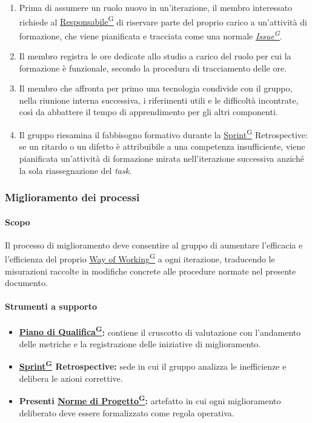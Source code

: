 \documentclass[a4paper,12pt]{article}
\providecommand{\glslink}[2]{\href{https://alittlebyte-19.github.io/Documentazione/glossario.html\#gls-#1}{\underline{#2}\textsuperscript{\scriptsize G}}}
\begin{document}
\begin{enumerate}
    \item Prima di assumere un ruolo nuovo in un'iterazione, il membro interessato richiede al \glslink{responsabile}{Responsabile} di riservare parte del proprio carico a un'attività di formazione, che viene pianificata e tracciata come una normale \textit{\glslink{issue}{Issue}}.
    \item Il membro registra le ore dedicate allo studio a carico del ruolo per cui la formazione è funzionale, secondo la procedura di tracciamento delle ore.
    \item Il membro che affronta per primo una tecnologia condivide con il gruppo, nella riunione interna successiva, i riferimenti utili e le difficoltà incontrate, così da abbattere il tempo di apprendimento per gli altri componenti.
    \item Il gruppo riesamina il fabbisogno formativo durante la \glslink{sprint}{Sprint} Retrospective: se un ritardo o un difetto è attribuibile a una competenza insufficiente, viene pianificata un'attività di formazione mirata nell'iterazione successiva anziché la sola riassegnazione del \textit{task}.
\end{enumerate}

\subsubsection{Miglioramento dei processi}

\paragraph{Scopo}
Il processo di miglioramento deve consentire al gruppo di aumentare l'efficacia e l'efficienza del proprio \glslink{way-of-working-wow}{Way of Working} a ogni iterazione, traducendo le misurazioni raccolte in modifiche concrete alle procedure normate nel presente documento.

\paragraph{Strumenti a supporto}
\begin{itemize}
    \item \textbf{\glslink{piano-di-qualifica}{Piano di Qualifica}:} contiene il cruscotto di valutazione con l'andamento delle metriche e la registrazione delle iniziative di miglioramento.
    \item \textbf{\glslink{sprint}{Sprint} Retrospective:} sede in cui il gruppo analizza le inefficienze e delibera le azioni correttive.
    \item \textbf{Presenti \glslink{norme-di-progetto}{Norme di Progetto}:} artefatto in cui ogni miglioramento deliberato deve essere formalizzato come regola operativa.
\end{itemize}
\end{document}

